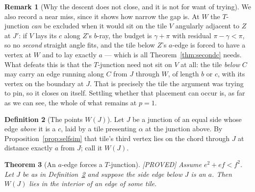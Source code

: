 \documentclass[11pt,reqno]{amsart}
\theoremstyle{plain}
\newtheorem{theorem}{Theorem}
\theoremstyle{definition}
\newtheorem{remark}[theorem]{Remark}
\newtheorem{definition}[theorem]{Definition}
\newcommand{\lab}[1]{\hfill\textnormal{\footnotesize\textsc{[#1]}}}
\begin{document}
\begin{remark}[Why the descent does not close, and it is not for want of trying]
We also record a near miss, since it shows how narrow the gap is. At $W$ the $T$-junction \emph{can}
be excluded when it would sit on the tile $V$ angularly adjacent to $Z$ at $J'$: if $V$ lays its $c$
along $Z$'s $b$-ray, the budget is $\gamma+\pi$ with residual $\pi-\gamma<\pi$, so no \emph{second}
straight angle fits, and the tile below $Z$'s $a$-edge is forced to have a vertex at $W$ and to lay
exactly $a$ --- which is all Theorem~\ref{thm:secondc} needs. What defeats this is that the
$T$-junction need not sit on $V$ at all: the tile \emph{below} $C$ may carry an edge running along $C$
from $J$ through $W$, of length $b$ or $c$, with its vertex on the boundary at $J$. That is precisely
the tile the argument was trying to pin, so it closes on itself. Settling whether that placement can
occur is, as far as we can see, the whole of what remains at $p=1$.
\end{remark}

\begin{definition}[The points $W(J)$]\label{def:WJ}
Let $J$ be a junction of an equal side whose edge \emph{above} it is a $c$, laid by a tile presenting
$\alpha$ at the junction above. By Proposition~\ref{prop:selfsim} that tile's third vertex lies on the
chord through $J$ at distance exactly $a$ from $J$; call it $W(J)$.
\end{definition}

\begin{theorem}[An $a$-edge forces a $T$-junction]\label{thm:aforcesT}\lab{PROVED}
Assume $e^{2}+ef<f^{2}$. Let $J$ be as in Definition~\ref{def:WJ} and suppose the side edge
\emph{below} $J$ is an $a$. Then $W(J)$ lies in the \emph{interior} of an edge of some tile.
\end{theorem}
\end{document}
